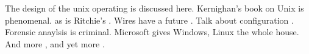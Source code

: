The design of the unix operating \cite{bach1986design} is discussed here.
Kernighan's \cite{kernighan1983unix} book on Unix is phenomenal.
as is Ritchie's \cite{ritchie1974unix}.
Wires have a future \cite{ho2001future}.
Talk about configuration \cite{hauck1998configuration}.
Forensic anaylsis \cite{stahlberg2007threats} is criminal. 
Microsoft gives Windows, Linux \cite{torvalds2002linux} the whole house.
And more \cite{buchholz2006structure}, and yet more \cite{gud2007chunkfs}.